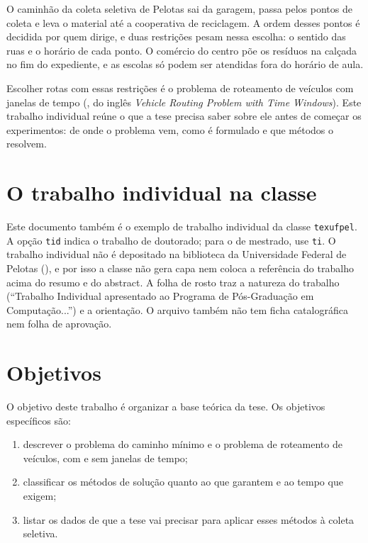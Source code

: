 \documentclass[tid]{texufpel}
\begin{document}
O caminhão da coleta seletiva de Pelotas sai da garagem, passa pelos pontos
de coleta e leva o material até a cooperativa de reciclagem. A ordem desses
pontos é decidida por quem dirige, e duas restrições pesam nessa escolha: o
sentido das ruas e o horário de cada ponto. O comércio do centro põe os
resíduos na calçada no fim do expediente, e as escolas só podem ser atendidas
fora do horário de aula.

Escolher rotas com essas restrições é o problema de roteamento de veículos
com janelas de tempo (, do inglês \textit{Vehicle Routing Problem with Time Windows}). Este
trabalho individual reúne o que a tese precisa saber sobre ele antes de
começar os experimentos: de onde o problema vem, como é formulado e que
métodos o resolvem.

\section{O trabalho individual na classe}

Este documento também é o exemplo de trabalho individual da classe
\texttt{texufpel}. A opção \texttt{tid} indica o trabalho de doutorado; para
o de mestrado, use \texttt{ti}. O trabalho individual não é depositado na
biblioteca da Universidade Federal de Pelotas
(), e por isso a classe
não gera capa nem coloca a referência do trabalho acima do resumo e do
abstract. A folha de rosto traz a natureza do trabalho (``Trabalho Individual
apresentado ao Programa de Pós-Graduação em Computação...'') e a orientação.
O arquivo também não tem ficha catalográfica nem folha de aprovação.

\section{Objetivos}

O objetivo deste trabalho é organizar a base teórica da tese. Os objetivos
específicos são:

\begin{enumerate}
  \item descrever o problema do caminho mínimo e o problema de roteamento de
        veículos, com e sem janelas de tempo;
  \item classificar os métodos de solução quanto ao que garantem e ao tempo
        que exigem;
  \item listar os dados de que a tese vai precisar para aplicar esses
        métodos à coleta seletiva.
\end{enumerate}
\end{document}
